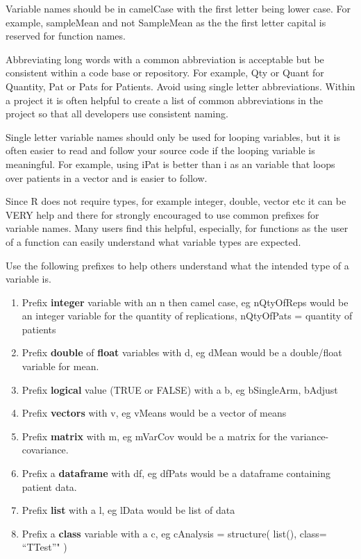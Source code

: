 \documentclass[
]{book}
\providecommand{\tightlist}{%
  \setlength{\itemsep}{0pt}\setlength{\parskip}{0pt}}
\begin{document}
Variable names should be in camelCase with the first letter being lower case. For example, sampleMean and not SampleMean as the the first letter capital is reserved for function names.

Abbreviating long words with a common abbreviation is acceptable but be consistent within a code base or repository. For example, Qty or Quant for Quantity, Pat or Pats for Patients. Avoid using single letter abbreviations. Within a project it is often helpful to create a list of common abbreviations in the project so that all developers use consistent naming.

Single letter variable names should only be used for looping variables, but it is often easier to read and follow your source code if the looping variable is meaningful. For example, using iPat is better than i as an variable that loops over patients in a vector and is easier to follow.

Since R does not require types, for example integer, double, vector etc it can be VERY help and there for strongly encouraged to use common prefixes for variable names. Many users find this helpful, especially, for functions as the user of a function can easily understand what variable types are expected.

Use the following prefixes to help others understand what the intended type of a variable is.

\begin{enumerate}
\def\labelenumi{\arabic{enumi}.}
\tightlist
\item
  Prefix \textbf{integer} variable with an n then camel case, eg nQtyOfReps would be an integer variable for the quantity of replications, nQtyOfPats = quantity of patients
\item
  Prefix \textbf{double} of \textbf{float} variables with d, eg dMean would be a double/float variable for mean.
\item
  Prefix \textbf{logical} value (TRUE or FALSE) with a b, eg bSingleArm, bAdjust
\item
  Prefix \textbf{vectors} with v, eg vMeans would be a vector of means
\item
  Prefix \textbf{matrix} with m, eg mVarCov would be a matrix for the variance-covariance.
\item
  Prefix a \textbf{dataframe} with df, eg dfPats would be a dataframe containing patient data.
\item
  Prefix \textbf{list} with a l, eg lData would be list of data
\item
  Prefix a \textbf{class} variable with a c, eg cAnalysis = structure( list(), class= ``TTest''" )
\end{enumerate}
\end{document}
